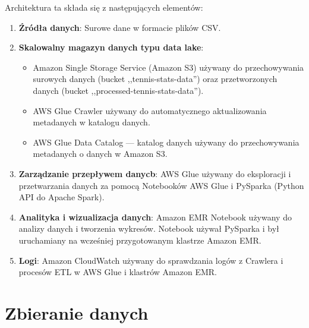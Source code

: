 \documentclass[12pt, a4paper]{article}
\begin{document}
Architektura ta składa się z następujących elementów:
\begin{enumerate}
    \item \textbf{Źródła danych}: Surowe dane w formacie plików CSV.
    \item \textbf{Skalowalny magazyn danych typu data lake}: 
    \begin{itemize}
        \item Amazon Single Storage Service (Amazon S3) używany do przechowywania surowych danych (bucket ,,tennis-stats-data'') oraz przetworzonych danych (bucket ,,processed-tennis-stats-data'').
        \item AWS Glue Crawler używany do automatycznego aktualizowania metadanych w katalogu danych.
        \item AWS Glue Data Catalog --- katalog danych używany do przechowywania metadanych o danych w Amazon S3.
    \end{itemize}
    \item \textbf{Zarządzanie przepływem danycb}: AWS Glue używany do eksploracji i przetwarzania danych za pomocą Notebooków AWS Glue i PySparka (Python API do Apache Spark).
    \item \textbf{Analityka i wizualizacja danych}:  Amazon EMR Notebook używany do analizy danych i tworzenia wykresów. Notebook używał PySparka i był uruchamiany na wcześniej przygotowanym klastrze Amazon EMR.
    \item \textbf{Logi}: Amazon CloudWatch używany do sprawdzania logów z Crawlera i procesów ETL w AWS Glue i klastrów Amazon EMR.

\end{enumerate}


\section{Zbieranie danych}
\end{document}

